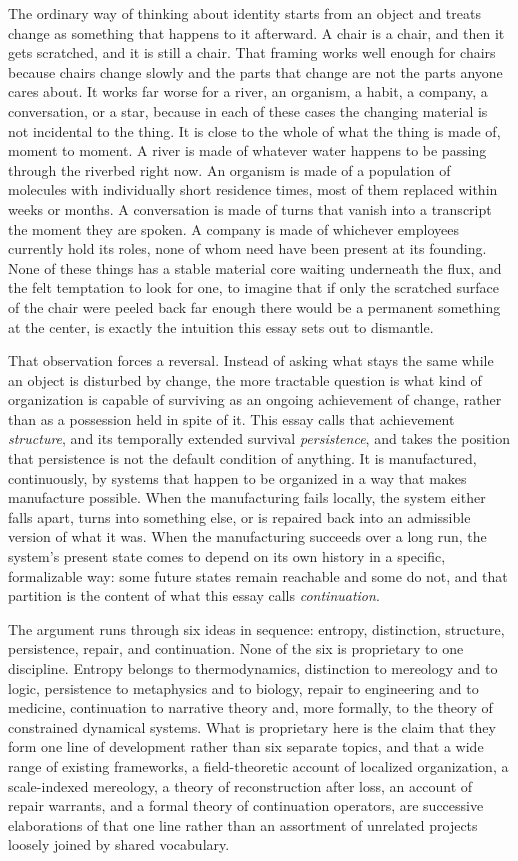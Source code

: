 \documentclass[11pt]{article}
\begin{document}
The ordinary way of thinking about identity starts from an object and treats change as something that happens to it afterward. A chair is a chair, and then it gets scratched, and it is still a chair. That framing works well enough for chairs because chairs change slowly and the parts that change are not the parts anyone cares about. It works far worse for a river, an organism, a habit, a company, a conversation, or a star, because in each of these cases the changing material is not incidental to the thing. It is close to the whole of what the thing is made of, moment to moment. A river is made of whatever water happens to be passing through the riverbed right now. An organism is made of a population of molecules with individually short residence times, most of them replaced within weeks or months. A conversation is made of turns that vanish into a transcript the moment they are spoken. A company is made of whichever employees currently hold its roles, none of whom need have been present at its founding. None of these things has a stable material core waiting underneath the flux, and the felt temptation to look for one, to imagine that if only the scratched surface of the chair were peeled back far enough there would be a permanent something at the center, is exactly the intuition this essay sets out to dismantle.

That observation forces a reversal. Instead of asking what stays the same while an object is disturbed by change, the more tractable question is what kind of organization is capable of surviving as an ongoing achievement of change, rather than as a possession held in spite of it. This essay calls that achievement \emph{structure}, and its temporally extended survival \emph{persistence}, and takes the position that persistence is not the default condition of anything. It is manufactured, continuously, by systems that happen to be organized in a way that makes manufacture possible. When the manufacturing fails locally, the system either falls apart, turns into something else, or is repaired back into an admissible version of what it was. When the manufacturing succeeds over a long run, the system's present state comes to depend on its own history in a specific, formalizable way: some future states remain reachable and some do not, and that partition is the content of what this essay calls \emph{continuation}.

The argument runs through six ideas in sequence: entropy, distinction, structure, persistence, repair, and continuation. None of the six is proprietary to one discipline. Entropy belongs to thermodynamics, distinction to mereology and to logic, persistence to metaphysics and to biology, repair to engineering and to medicine, continuation to narrative theory and, more formally, to the theory of constrained dynamical systems. What is proprietary here is the claim that they form one line of development rather than six separate topics, and that a wide range of existing frameworks, a field-theoretic account of localized organization, a scale-indexed mereology, a theory of reconstruction after loss, an account of repair warrants, and a formal theory of continuation operators, are successive elaborations of that one line rather than an assortment of unrelated projects loosely joined by shared vocabulary.
\end{document}
